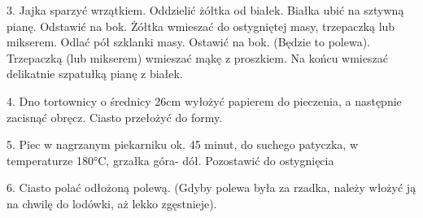 \documentclass[12pt, letterpaper, titlepage]{article}
\begin{document}
\begin{Huge}
\begin{flushleft}
3. Jajka sparzyć wrzątkiem.  Oddzielić żółtka od białek. Białka ubić na sztywną pianę. Odstawić na bok. Żółtka wmieszać do ostygniętej masy, trzepaczką lub mikserem. Odlać pół szklanki masy. Ostawić na bok. (Będzie to polewa). Trzepaczką (lub mikserem) wmieszać mąkę z proszkiem. Na końcu wmieszać delikatnie szpatułką pianę z białek.
\end{flushleft}
\begin{flushleft}

4. Dno tortownicy o średnicy 26cm wyłożyć papierem do pieczenia, a następnie zacisnąć obręcz. Ciasto przełożyć do formy.
\end{flushleft}

\begin{flushleft}
5. Piec w nagrzanym piekarniku ok. 45 minut, do suchego patyczka, w temperaturze 180°C, grzałka góra- dół. Pozostawić do ostygnięcia
\end{flushleft}
\begin{flushleft}

6. Ciasto polać odłożoną polewą. (Gdyby polewa była za rzadka, należy włożyć ją na chwilę do lodówki, aż lekko zgęstnieje).
\end{flushleft}


\end{Huge}
\end{document}
